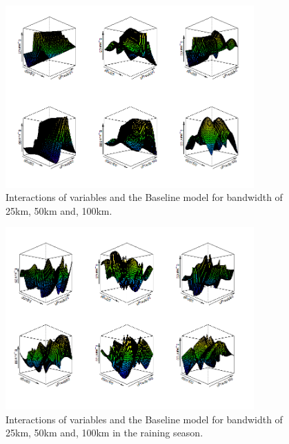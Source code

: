 \begin{table}


\begin{figure}[H]
  \centering
  \includegraphics[width=0.85\textwidth, inner]{visgam.png}
\caption[Interactions of variables and the Baseline model for bandwidth of 25km, 50km and, 100km]{Interactions of variables and the Baseline model for bandwidth of 25km, 50km and, 100km.}
\label{fig:visgam}
\end{figure}
\end{table}

\begin{table}

\begin{figure}[H]
  \centering
  \includegraphics[width=0.85\textwidth, inner]{visgamr.png}
\caption[Interactions of variables and the Baseline model for bandwidth of 25km, 50km and, 100km in the raining season]{Interactions of variables and the Baseline model for bandwidth of 25km, 50km and, 100km in the raining season. }
\label{fig:visgamr}
\end{figure}
\end{table}

